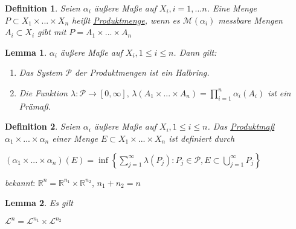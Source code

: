 \documentclass[11pt]{memoir}
\theoremstyle{changebreak}
\newtheorem{Definition}{Definition}[chapter]
\newtheorem{Lemma}{Lemma}[chapter]
\begin{document}
\begin{Definition}
Seien $\alpha_i$ äußere Maße auf $X_i, i = 1, ... n$. Eine Menge $P \subset X_1 \times ... \times X_n$ heißt \underline{Produktmenge}, wenn es $\mathscr M(\alpha_i)$ messbare Mengen $A_i \subset X_i$ gibt mit $P = A_1 \times ... \times A_n$
\end{Definition}

\begin{Lemma}
$\alpha_i$ äußere Maße auf $X_i, 1 \leq i \leq n$. Dann gilt:
\begin{enumerate}
	\item Das System $\mathscr P$ der Produktmengen ist ein Halbring.
	\item Die Funktion $\lambda: \mathscr P \rightarrow [0, \infty], \, \lambda(A_1 \times ... \times A_n) = \prod\limits_{i=1}^n \alpha_i(A_i)$ ist ein Prämaß.
\end{enumerate}
\end{Lemma}

\begin{Definition}
Seien $\alpha_i$ äußere Maße auf $X_i, 1 \leq i \leq n$. Das \underline{Produktmaß} $\alpha_1 \times ... \times \alpha_n$ einer Menge $E \subset X_1 \times ... \times X_n$ ist definiert durch
\begin{center}
	$(\alpha_1 \times ... \times \alpha_n)(E) = \inf\left\{ \sum\limits_{j=1}^\infty \lambda(P_j): P_j \in \mathscr P, E \subset \bigcup\limits_{j=1}^\infty P_j \right\}$

\end{center}
\end{Definition}

\emph{bekannt}:
$\mathbb R^n = \mathbb R^{n_1} \times \mathbb R^{n_2}$, $n_1 + n_2 = n$

\begin{Lemma}
Es gilt
\begin{center}
	$\mathscr L^n = \mathscr L^{n_1} \times \mathscr L^{n_2}$
\end{center}
\end{Lemma}

\end{document}
